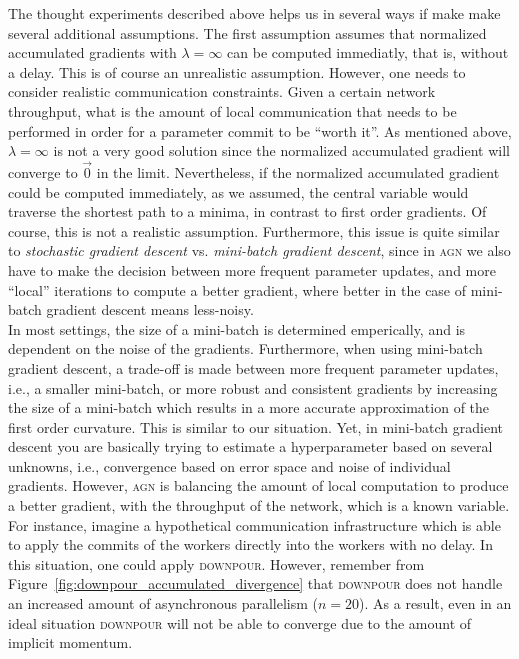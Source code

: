 The thought experiments described above helps us in several ways if make make several additional assumptions. The first assumption assumes that normalized accumulated gradients with $\lambda = \infty$ can be computed immediatly, that is, without a delay. This is of course an unrealistic assumption. However, one needs to consider realistic communication constraints. Given a certain network throughput, what is the amount of local communication that needs to be performed in order for a parameter commit to be ``worth it''. As mentioned above, $\lambda = \infty$ is not a very good solution since the normalized accumulated gradient will converge to $\vec{0}$ in the limit. Nevertheless, if the normalized accumulated gradient could be computed immediately, as we assumed, the central variable would traverse the shortest path to a minima, in contrast to first order gradients. Of course, this is not a realistic assumption. Furthermore, this issue is quite similar to \emph{stochastic gradient descent} vs. \emph{mini-batch gradient descent}, since in \textsc{agn} we also have to make the decision between more frequent parameter updates, and more ``local'' iterations to compute a better gradient, where better in the case of mini-batch gradient descent means less-noisy.\\

In most settings, the size of a mini-batch is determined emperically, and is dependent on the noise of the gradients. Furthermore, when using mini-batch gradient descent, a trade-off is made between more frequent parameter updates, i.e., a smaller mini-batch, or more robust and consistent gradients by increasing the size of a mini-batch which results in a more accurate approximation of the first order curvature. This is similar to our situation. Yet, in mini-batch gradient descent you are basically trying to estimate a hyperparameter based on several unknowns, i.e., convergence based on error space and noise of individual gradients. However, \textsc{agn} is balancing the amount of local computation to produce a better gradient, with the throughput of the network, which is a known variable. For instance, imagine a hypothetical communication infrastructure which is able to apply the commits of the workers directly into the workers with no delay. In this situation, one could apply \textsc{downpour}. However, remember from Figure~\ref{fig:downpour_accumulated_divergence} that \textsc{downpour} does not handle an increased amount of asynchronous parallelism ($n = 20$). As a result, even in an ideal situation \textsc{downpour} will not be able to converge due to the amount of implicit momentum.\\

